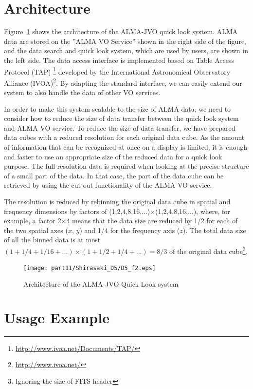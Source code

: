 \section{Architecture}

Figure~\ref{fig:2} shows the architecture of the ALMA-JVO quick look system. ALMA data are stored on the ''ALMA VO Service'' shown in the right side of the figure, and the data search and quick look system, which are used by users, are shown in the left side. The data access interface is implemented based on Table Access Protocol (TAP) \footnote{\url{http://www.ivoa.net/Documents/TAP/}} developed by the International Astronomical Observatory Alliance (IVOA)\footnote{\url{http://www.ivoa.net/}}. By adapting the standard interface, we can easily extend our system to also handle the data of other VO services.

In order to make this system scalable to the size of ALMA data, we need to consider how to reduce the size of data transfer between the quick look system and ALMA VO service. To reduce the size of data transfer, we have prepared data cubes with a reduced resolution for each original data cube. As the amount of information that can be recognized at once on a display  is limited, it is enough and faster to use an appropriate size of the reduced data for a quick look purpose. The full-resolution data is required when looking at the precise structure of a small part of the data. In that case, the part of the data cube can be retrieved by using the cut-out functionality of the ALMA VO service.

The resolution is reduced by rebinning the original data cube in spatial and frequency dimensions by factors of (1,2,4,8,16,...)$\times$(1,2,4,8,16,...), where, for example, a factor 2$\times$4 means that the data size are reduced by 1/2 for each of the two spatial axes ($x$, $y$) and 1/4 for the frequency axis ($z$). The total data size of all the binned data is at most  $(1 + 1/4 + 1/16 + ...) \times (1 + 1/2 + 1/4 + ...) = 8/3$  of the original data cube\footnote{Ignoring the size of FITS header}.


\begin{figure}[t]
\begin{center}
\texttt{[image: part11/Shirasaki\_D5/D5\_f2.eps]}
\caption{Architecture of the ALMA-JVO Quick Look system}
\label{fig:2}
\end{center}
\end{figure}

\section{Usage Example}

